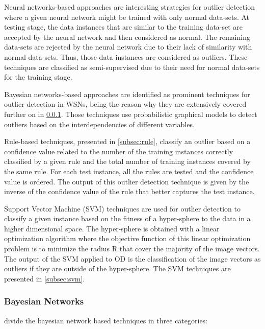 \vspace{0.5em}

Neural networks-based approaches are interesting strategies for outlier detection where a given neural network might be trained with only normal data-sets. 
At testing stage, the data instances that are similar to the training data-set are accepted by the neural network and then considered as normal. 
The remaining data-sets are rejected by the neural network due to their lack of similarity with normal data-sets. Thus, those data instances are considered as outliers. 
These techniques are classified as semi-supervised due to their need for normal data-sets for the training stage.

\vspace{0.5em}

Bayesian networks-based approaches are identified as prominent techniques for outlier detection in WSNs, being the reason why they are extensively covered further on in \ref{subsec:bay}.
Those techniques use probabilistic graphical models to detect outliers based on the interdependencies of different variables.

\vspace{0.5em}

Rule-based techniques, presented in \ref{subsec:rule}, classify an outlier based on a confidence value related to the number of the training instances correctly classified by a given rule and the total number of training instances covered by the same rule. For each test instance, all the rules are tested and the confidence value is ordered. The output of this outlier detection technique is given by the inverse of the confidence value of the rule that better captures the test instance.

\vspace{0.5em}

Support Vector Machine (SVM) techniques are used for outlier detection to classify a given instance based on the fitness of a hyper-sphere to the data in a higher dimensional space. 
The hyper-sphere is obtained with a linear optimization algorithm where the objective function of this linear optimization problem is to minimize the radius R that cover the majority of the image vectors. The output of the SVM applied to OD is the classification of the image vectors as outliers if they are outside of the hyper-sphere. The SVM techniques are presented in \ref{subsec:svm}.
\subsubsection{Bayesian Networks}
\label{subsec:bay}
\cite{gen:zhang:2010} divide the bayesian network based techniques in three categories: 

